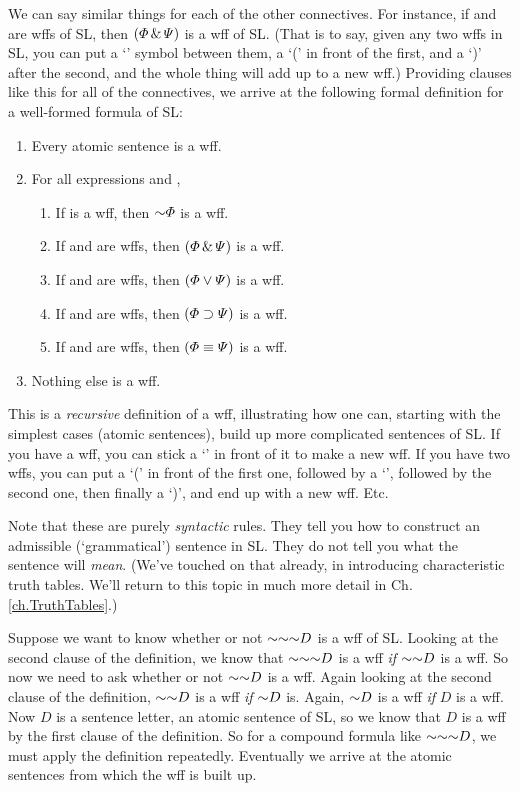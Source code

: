 We can say similar things for each of the other connectives. For instance, if \metaA{} and \metaB{} are wffs of SL, then $(\varPhi{}\,\&\,\varPsi{})$ is a wff of SL. (That is to say, given any two wffs in SL, you can put a `\eand' symbol between them, a `(' in front of the first, and a `)' after the second, and the whole thing will add up to a new wff.)  Providing clauses like this for all of the connectives, we arrive at the following formal definition for a {well-formed formula of SL}:

\begin{enumerate}
\item Every atomic sentence is a wff.
\item For all expressions \metaA{} and \metaB{},
	\begin{enumerate}
		\item If \metaA{} is a wff, then $\enot\metaA{}$ is a wff.
		\item If \metaA{} and \metaB{} are wffs, then $(\varPhi{}\,\&\,\varPsi{})$ is a wff.
		\item If \metaA{} and \metaB{} are wffs, then $(\varPhi{}\vee\varPsi{})$ is a wff.
		\item If \metaA{} and \metaB{} are wffs, then $(\varPhi{}\supset\varPsi{})$ is a wff.
		\item If \metaA{} and \metaB{} are wffs, then $(\varPhi{}\equiv\varPsi{})$ is a wff.
	\end{enumerate}
\item Nothing else is a wff.
\end{enumerate}

This is a \emph{recursive} definition of a wff, illustrating how one can, starting with the simplest cases (atomic sentences), build up more complicated sentences of SL. If you have a wff, you can stick a `\enot' in front of it to make a new wff. If you have two wffs, you can put a `(' in front of the first one, followed by a `\eand', followed by the second one, then finally a `)', and end up with a new wff. Etc.

Note that these are purely \emph{syntactic} rules. They tell you how to construct an admissible (`grammatical') sentence in SL. They do not tell you what the sentence will \emph{mean}. (We've touched on that already, in introducing characteristic truth tables. We'll return to this topic in much more detail in Ch. \ref{ch.TruthTables}.)

Suppose we want to know whether or not $\enot \enot \enot D$ is a wff of SL. Looking at the second clause of the definition, we know that $\enot \enot \enot D$ is a wff \emph{if} $\enot \enot D$ is a wff. So now we need to ask whether or not $\enot \enot D$ is a wff. Again looking at the second clause of the definition, $\enot \enot D$ is a wff \emph{if} $\enot D$ is. Again, $\enot D$ is a wff \emph{if} $D$ is a wff. Now $D$ is a sentence letter, an atomic sentence of SL, so we know that $D$ is a wff by the first clause of the definition. So for a compound formula like $\enot \enot \enot D$, we must apply the definition repeatedly. Eventually we arrive at the atomic sentences from which the wff is built up.

